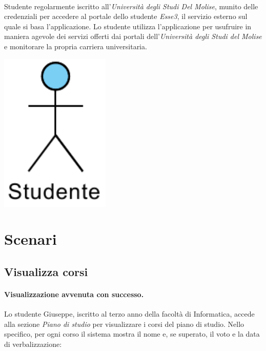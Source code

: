 \paragraph{} 
Studente regolarmente iscritto all’\textit{Università degli Studi Del Molise}, munito delle credenziali per accedere al portale dello studente \textit{Esse3}, il servizio esterno sul quale si basa l’applicazione. Lo studente utilizza l’applicazione per usufruire in maniera agevole dei servizi offerti dai portali dell’\textit{Università degli Studi del Molise} e monitorare la propria carriera universitaria.
\begin{center}
	\includegraphics[height=3in]{imgs/gruppo1/Attore-Studente.pdf}
\end{center}

\section{Scenari}

\subsection{Visualizza corsi}
\paragraph{Visualizzazione avvenuta con successo.} 
Lo studente Giuseppe, iscritto al terzo anno della facoltà di Informatica, accede alla sezione \textit{Piano di studio} per visualizzare i corsi del piano di studio. Nello specifico, per ogni corso il sistema mostra il nome e, se superato, il voto e la data di verbalizzazione:


